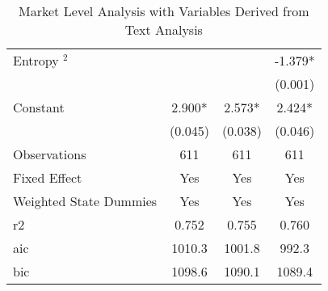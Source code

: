 \begin{table}[]
\begin{tabular}{@{}lccc@{}}
Entropy $^2$                       &               &               & -1.379*       \\
                                         &               &               & (0.001)       \\
Constant                                 & 2.900*        & 2.573*        & 2.424*        \\
                                         & (0.045)       & (0.038)       & (0.046)       \\
Observations                             & 611           & 611           & 611           \\
Fixed Effect                             & Yes           & Yes           & Yes           \\
Weighted State Dummies                   & Yes           & Yes           & Yes           \\
r2                                       & 0.752         & 0.755         & 0.760         \\
aic                                      & 1010.3        & 1001.8        & 992.3         \\
bic                                      & 1098.6        & 1090.1        & 1089.4        \\ \bottomrule
\end{tabular}
\caption{Market Level Analysis with Variables Derived from Text Analysis}
\label{reg_mkt_textbased}
\end{table}